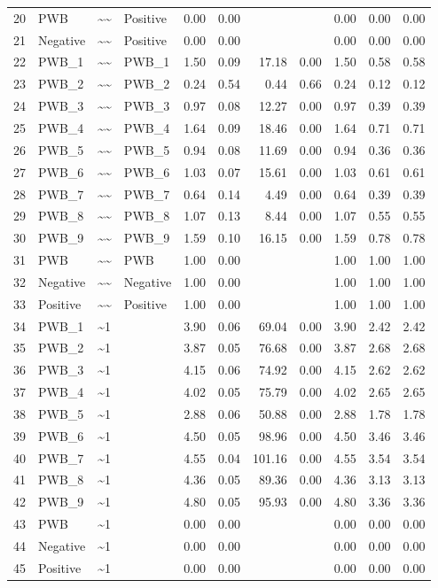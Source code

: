 \documentclass{article}
\begin{document}
\begin{table}[ht]
\begin{tabular}{rlllrrrrrrr}
  20 & PWB & \~{}\~{} & Positive & 0.00 & 0.00 &  &  & 0.00 & 0.00 & 0.00 \\ 
  21 & Negative & \~{}\~{} & Positive & 0.00 & 0.00 &  &  & 0.00 & 0.00 & 0.00 \\ 
  22 & PWB\_1 & \~{}\~{} & PWB\_1 & 1.50 & 0.09 & 17.18 & 0.00 & 1.50 & 0.58 & 0.58 \\ 
  23 & PWB\_2 & \~{}\~{} & PWB\_2 & 0.24 & 0.54 & 0.44 & 0.66 & 0.24 & 0.12 & 0.12 \\ 
  24 & PWB\_3 & \~{}\~{} & PWB\_3 & 0.97 & 0.08 & 12.27 & 0.00 & 0.97 & 0.39 & 0.39 \\ 
  25 & PWB\_4 & \~{}\~{} & PWB\_4 & 1.64 & 0.09 & 18.46 & 0.00 & 1.64 & 0.71 & 0.71 \\ 
  26 & PWB\_5 & \~{}\~{} & PWB\_5 & 0.94 & 0.08 & 11.69 & 0.00 & 0.94 & 0.36 & 0.36 \\ 
  27 & PWB\_6 & \~{}\~{} & PWB\_6 & 1.03 & 0.07 & 15.61 & 0.00 & 1.03 & 0.61 & 0.61 \\ 
  28 & PWB\_7 & \~{}\~{} & PWB\_7 & 0.64 & 0.14 & 4.49 & 0.00 & 0.64 & 0.39 & 0.39 \\ 
  29 & PWB\_8 & \~{}\~{} & PWB\_8 & 1.07 & 0.13 & 8.44 & 0.00 & 1.07 & 0.55 & 0.55 \\ 
  30 & PWB\_9 & \~{}\~{} & PWB\_9 & 1.59 & 0.10 & 16.15 & 0.00 & 1.59 & 0.78 & 0.78 \\ 
  31 & PWB & \~{}\~{} & PWB & 1.00 & 0.00 &  &  & 1.00 & 1.00 & 1.00 \\ 
  32 & Negative & \~{}\~{} & Negative & 1.00 & 0.00 &  &  & 1.00 & 1.00 & 1.00 \\ 
  33 & Positive & \~{}\~{} & Positive & 1.00 & 0.00 &  &  & 1.00 & 1.00 & 1.00 \\ 
  34 & PWB\_1 & \~{}1 &  & 3.90 & 0.06 & 69.04 & 0.00 & 3.90 & 2.42 & 2.42 \\ 
  35 & PWB\_2 & \~{}1 &  & 3.87 & 0.05 & 76.68 & 0.00 & 3.87 & 2.68 & 2.68 \\ 
  36 & PWB\_3 & \~{}1 &  & 4.15 & 0.06 & 74.92 & 0.00 & 4.15 & 2.62 & 2.62 \\ 
  37 & PWB\_4 & \~{}1 &  & 4.02 & 0.05 & 75.79 & 0.00 & 4.02 & 2.65 & 2.65 \\ 
  38 & PWB\_5 & \~{}1 &  & 2.88 & 0.06 & 50.88 & 0.00 & 2.88 & 1.78 & 1.78 \\ 
  39 & PWB\_6 & \~{}1 &  & 4.50 & 0.05 & 98.96 & 0.00 & 4.50 & 3.46 & 3.46 \\ 
  40 & PWB\_7 & \~{}1 &  & 4.55 & 0.04 & 101.16 & 0.00 & 4.55 & 3.54 & 3.54 \\ 
  41 & PWB\_8 & \~{}1 &  & 4.36 & 0.05 & 89.36 & 0.00 & 4.36 & 3.13 & 3.13 \\ 
  42 & PWB\_9 & \~{}1 &  & 4.80 & 0.05 & 95.93 & 0.00 & 4.80 & 3.36 & 3.36 \\ 
  43 & PWB & \~{}1 &  & 0.00 & 0.00 &  &  & 0.00 & 0.00 & 0.00 \\ 
  44 & Negative & \~{}1 &  & 0.00 & 0.00 &  &  & 0.00 & 0.00 & 0.00 \\ 
  45 & Positive & \~{}1 &  & 0.00 & 0.00 &  &  & 0.00 & 0.00 & 0.00 \\ 
   \hline
\end{tabular}
\end{table}
\end{document}

